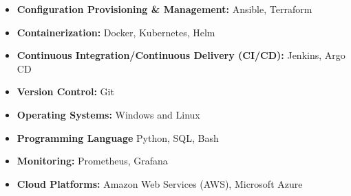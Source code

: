 \documentclass[11pt,a4paper]{moderncv}
\begin{document}
\begin{itemize}
	\item \textbf{Configuration Provisioning \& Management:} Ansible, Terraform
	\item \textbf{Containerization:} Docker, Kubernetes, Helm
	\item \textbf{Continuous Integration/Continuous Delivery (CI/CD):} Jenkins, Argo CD %
	\item \textbf{Version Control:} Git
	
	\item \textbf{Operating Systems:} Windows and Linux
	
	\item \textbf{Programming Language} Python, SQL, Bash %
	
	\item \textbf{Monitoring:} Prometheus, Grafana
	
	\item \textbf{Cloud Platforms:} Amazon Web Services (AWS), Microsoft Azure
	
	
\end{itemize}
\end{document}
